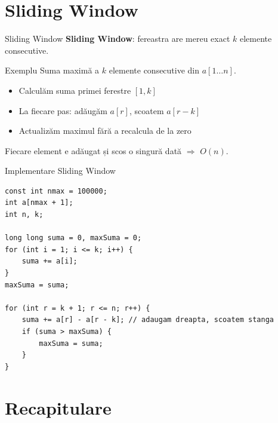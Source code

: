 ﻿\documentclass{beamer}
\begin{document}
\section{Sliding Window}

\begin{frame}{Sliding Window}
  \textbf{Sliding Window}: fereastra are mereu exact $k$ elemente consecutive.

  \begin{block}{Exemplu}
    Suma maximă a $k$ elemente consecutive din $a[1 \ldots n]$.
  \end{block}

  \begin{itemize}
    \item Calculăm suma primei ferestre $[1, k]$
    \item La fiecare pas: adăugăm $a[r]$, scoatem $a[r-k]$
    \item Actualizăm maximul \textemdash{} fără a recalcula de la zero
  \end{itemize}

  \smallskip
  Fiecare element e adăugat și scos o singură dată $\Rightarrow$ $O(n)$.
\end{frame}

\begin{frame}{Implementare \textemdash{} Sliding Window}
  \begin{lstlisting}
const int nmax = 100000;
int a[nmax + 1];
int n, k;

long long suma = 0, maxSuma = 0;
for (int i = 1; i <= k; i++) {
    suma += a[i];
}
maxSuma = suma;

for (int r = k + 1; r <= n; r++) {
    suma += a[r] - a[r - k]; // adaugam dreapta, scoatem stanga
    if (suma > maxSuma) {
        maxSuma = suma;
    }
}
  \end{lstlisting}
\end{frame}

\section{Recapitulare}
\end{document}
